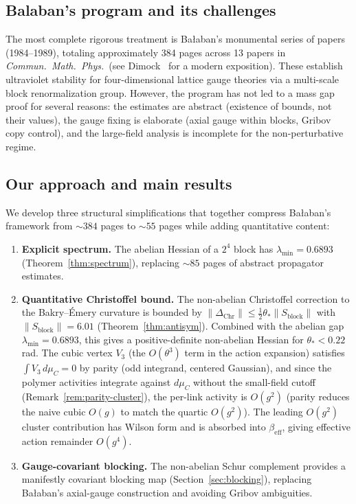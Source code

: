 \documentclass[11pt]{article}
\theoremstyle{definition}
\begin{document}
\subsection{Balaban's program and its challenges}

The most complete rigorous treatment is Ba\l aban's monumental series
of papers~\cite{BalabanI,BalabanII,BalabanIII,BalabanLF1,BalabanLF2}
(1984--1989), totaling approximately 384 pages across 13 papers in
\emph{Commun.\ Math.\ Phys.}\ (see Dimock~\cite{DimockI,DimockII}
for a modern exposition).  These establish ultraviolet stability for
four-dimensional lattice gauge theories via a multi-scale block
renormalization group.  However, the program has not led to a mass gap
proof for several reasons: the estimates are abstract (existence of
bounds, not their values), the gauge fixing is elaborate (axial gauge
within blocks, Gribov copy control), and the large-field analysis is
incomplete for the non-perturbative regime.

\subsection{Our approach and main results}

We develop three structural simplifications that together compress
Ba\l aban's framework from ${\sim}384$ pages to ${\sim}55$ pages while
adding quantitative content:

\begin{enumerate}[nosep]
\item \textbf{Explicit spectrum.}
The abelian Hessian of a $2^4$ block has $\lambda_{\min}=0.6893$
(Theorem~\ref{thm:spectrum}), replacing ${\sim}85$ pages of abstract
propagator estimates.

\item \textbf{Quantitative Christoffel bound.}
The non-abelian Christoffel correction to the Bakry--\'Emery curvature
is bounded by $\|\Delta_{\mathrm{Chr}}\|\le\frac{1}{2}\theta_*\|S_{\mathrm{block}}\|$
with $\|S_{\mathrm{block}}\|=6.01$
(Theorem~\ref{thm:antisym}).  Combined with the abelian gap
$\lambda_{\min}=0.6893$, this gives a positive-definite non-abelian
Hessian for $\theta_*<0.22$\,rad.  The cubic vertex $V_3$
(the $O(\theta^3)$ term in the action expansion) satisfies
$\int V_3\,d\mu_C=0$ by parity (odd integrand, centered Gaussian),
and since the polymer activities integrate against $d\mu_C$ without
the small-field cutoff (Remark~\ref{rem:parity-cluster}), the
per-link activity is $O(g^2)$ (parity reduces the naive cubic
$O(g)$ to match the quartic $O(g^2)$).  The leading $O(g^2)$
cluster contribution has Wilson form and is absorbed into
$\beta_{\mathrm{eff}}$, giving effective action remainder $O(g^4)$.

\item \textbf{Gauge-covariant blocking.}
The non-abelian Schur complement provides a manifestly covariant
blocking map (Section~\ref{sec:blocking}), replacing Ba\l aban's
axial-gauge construction and avoiding Gribov ambiguities.
\end{enumerate}
\end{document}
